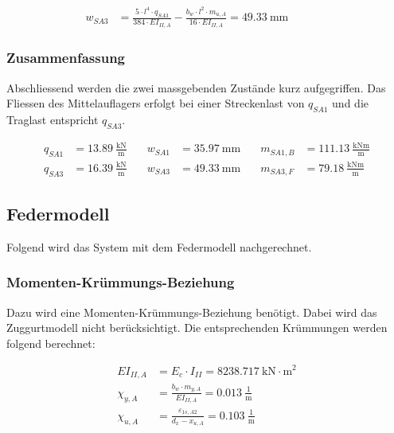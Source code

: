 \documentclass[
  11pt,
  letterpaper,
]{scrreprt}
\begin{document}
\[
\begin{aligned}
w_{SA3}& = \frac{5 \cdot l^{4} \cdot q_{SA3}}{384 \cdot EI_{II , A}} - \frac{b_{w} \cdot l^{2} \cdot m_{u , A}}{16 \cdot EI_{II , A}} = 49.33 \ \mathrm{mm} \quad &  \quad &  
 \end{aligned}
\]

\subsubsection{Zusammenfassung}\label{zusammenfassung-1}

Abschliessend werden die zwei massgebenden Zustände kurz aufgegriffen.
Das Fliessen des Mittelauflagers erfolgt bei einer Streckenlast von
\(q_{SA1}\) und die Traglast entspricht \(q_{SA3}\).

\[
\begin{aligned}
q_{SA1}& = 13.89 \ \frac{\mathrm{kN}}{\mathrm{m}} \quad & w_{SA1}& = 35.97 \ \mathrm{mm} \quad & m_{SA1 , B}& = 111.13 \ \frac{\mathrm{kNm}}{\mathrm{m}} \\ 
q_{SA3}& = 16.39 \ \frac{\mathrm{kN}}{\mathrm{m}} \quad & w_{SA3}& = 49.33 \ \mathrm{mm} \quad & m_{SA3 , F}& = 79.18 \ \frac{\mathrm{kNm}}{\mathrm{m}} \end{aligned}
\]

\subsection{Federmodell}\label{federmodell}

Folgend wird das System mit dem Federmodell nachgerechnet.

\subsubsection{Momenten-Krümmungs-Beziehung}\label{momenten-kruxfcmmungs-beziehung}

Dazu wird eine Momenten-Krümmungs-Beziehung benötigt. Dabei wird das
Zuggurtmodell nicht berücksichtigt. Die entsprechenden Krümmungen werden
folgend berechnet:

\[
\begin{aligned}
EI_{II , A}& = E_{c} \cdot I_{II} = 8238.717 \ \mathrm{kN} \cdot \mathrm{m}^{2} \\ 
\chi_{y , A}& = \frac{b_{w} \cdot m_{y , A}}{EI_{II , A}} = 0.013 \ \frac{1}{\mathrm{m}} \\ 
\chi_{u , A}& = \frac{\varepsilon_{1 s , A2}}{d_{x} - x_{u , A}} = 0.103 \ \frac{1}{\mathrm{m}} \end{aligned}
\]
\end{document}
